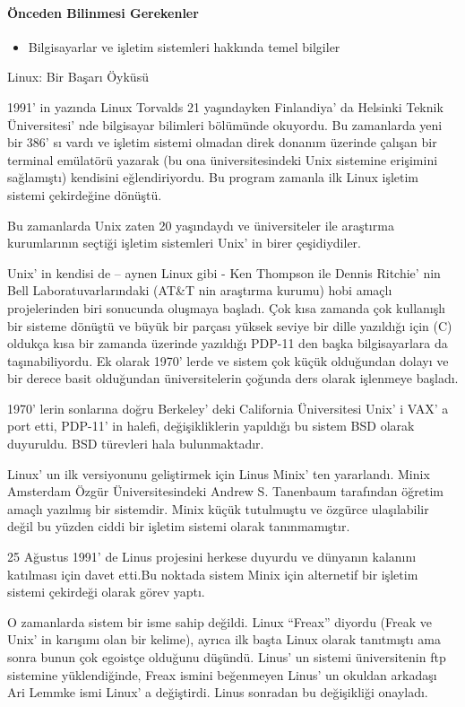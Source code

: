 \paragraph{Önceden Bilinmesi Gerekenler}
\begin{itemize}
 \item Bilgisayarlar ve işletim sistemleri hakkında temel bilgiler
 \end{itemize}
\begin{section}{Linux: Bir Başarı Öyküsü}

1991' in yazında Linux Torvalds 21 yaşındayken Finlandiya’ da Helsinki Teknik Üniversitesi' nde bilgisayar bilimleri bölümünde okuyordu. Bu zamanlarda yeni bir 386' sı vardı ve işletim sistemi olmadan direk donanım üzerinde çalışan bir terminal emülatörü yazarak (bu ona üniversitesindeki Unix sistemine erişimini sağlamıştı) kendisini eğlendiriyordu.  Bu program zamanla ilk Linux işletim sistemi çekirdeğine dönüştü.

Bu zamanlarda Unix zaten 20 yaşındaydı ve üniversiteler ile araştırma kurumlarının seçtiği işletim sistemleri Unix' in birer çeşidiydiler.

Unix' in kendisi de – aynen Linux gibi - Ken Thompson ile Dennis Ritchie' nin Bell Laboratuvarlarındaki (AT\&T nin araştırma kurumu) hobi amaçlı projelerinden biri sonucunda oluşmaya başladı. Çok kısa zamanda çok kullanışlı bir sisteme dönüştü ve büyük bir parçası yüksek seviye bir dille yazıldığı için (C) oldukça kısa bir zamanda üzerinde yazıldığı PDP-11 den başka bilgisayarlara da taşınabiliyordu. Ek olarak 1970' lerde ve sistem çok küçük olduğundan dolayı ve bir derece basit olduğundan üniversitelerin çoğunda ders olarak işlenmeye başladı.

1970' lerin sonlarına doğru Berkeley' deki California Üniversitesi Unix' i VAX' a port etti, PDP-11' in halefi, değişikliklerin yapıldığı bu sistem BSD olarak duyuruldu. BSD türevleri hala bulunmaktadır.

Linux’ un ilk versiyonunu geliştirmek için Linus Minix’ ten yararlandı. Minix Amsterdam Özgür Üniversitesindeki Andrew S. Tanenbaum tarafından öğretim amaçlı yazılmış bir sistemdir. Minix küçük tutulmuştu ve özgürce ulaşılabilir değil bu yüzden ciddi bir işletim sistemi olarak tanınmamıştır.

25 Ağustus 1991’ de Linus projesini herkese duyurdu ve dünyanın kalanını katılması için davet etti.Bu noktada sistem Minix için alternetif bir işletim sistemi çekirdeği olarak görev yaptı.

O zamanlarda sistem bir isme sahip değildi. Linux “Freax” diyordu (Freak ve Unix' in karışımı olan bir kelime), ayrıca ilk başta Linux olarak tanıtmıştı ama sonra bunun çok egoistçe olduğunu düşündü. Linus’ un sistemi üniversitenin ftp sistemine yüklendiğinde, Freax ismini beğenmeyen Linus’ un okuldan arkadaşı Ari Lemmke ismi Linux’ a değiştirdi. Linus sonradan bu değişikliği onayladı.


\end{section}
